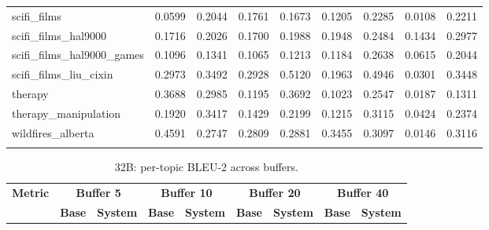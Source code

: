 \documentclass[pdflatex,sn-mathphys-num]{sn-jnl}%
\theoremstyle{thmstyleone}%
\theoremstyle{thmstyletwo}%
\theoremstyle{thmstylethree}%
\begin{document}
\begin{appendices}
\begin{landscape}
\begin{longtable}{@{}p{3.8cm}cccccccc@{}}
scifi\_films & 0.0599 & 0.2044 & 0.1761 & 0.1673 & 0.1205 & 0.2285 & 0.0108 & 0.2211 \\
scifi\_films\_hal9000 & 0.1716 & 0.2026 & 0.1700 & 0.1988 & 0.1948 & 0.2484 & 0.1434 & 0.2977 \\
scifi\_films\_hal9000\_games & 0.1096 & 0.1341 & 0.1065 & 0.1213 & 0.1184 & 0.2638 & 0.0615 & 0.2044 \\
scifi\_films\_liu\_cixin & 0.2973 & 0.3492 & 0.2928 & 0.5120 & 0.1963 & 0.4946 & 0.0301 & 0.3448 \\
therapy & 0.3688 & 0.2985 & 0.1195 & 0.3692 & 0.1023 & 0.2547 & 0.0187 & 0.1311 \\
therapy\_manipulation & 0.1920 & 0.3417 & 0.1429 & 0.2199 & 0.1215 & 0.3115 & 0.0424 & 0.2374 \\
wildfires\_alberta & 0.4591 & 0.2747 & 0.2809 & 0.2881 & 0.3455 & 0.3097 & 0.0146 & 0.3116 \\
\botrule
\end{longtable}
\normalsize
\end{landscape}
\begin{landscape}
\tiny
\begin{longtable}{@{}p{3.8cm}cccccccc@{}}
\caption{32B: per-topic BLEU-2 across buffers.}\label{tab:app_32b_bleu_topics}\\

\toprule
\textbf{Metric} & \multicolumn{2}{c}{\textbf{Buffer 5}} & \multicolumn{2}{c}{\textbf{Buffer 10}} & \multicolumn{2}{c}{\textbf{Buffer 20}} & \multicolumn{2}{c}{\textbf{Buffer 40}} \\
\cmidrule(lr){2-3}\cmidrule(lr){4-5}\cmidrule(lr){6-7}\cmidrule(lr){8-9}
 & \textbf{Base} & \textbf{System} & \textbf{Base} & \textbf{System} & \textbf{Base} & \textbf{System} & \textbf{Base} & \textbf{System} \\
\midrule
\endfirsthead


\end{longtable}
\end{landscape}
\end{appendices}
\end{document}
